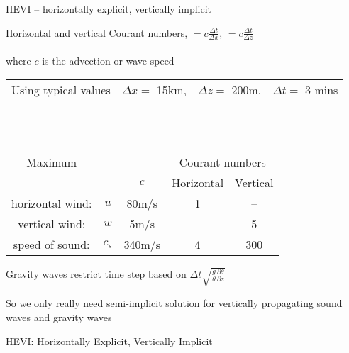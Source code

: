 \begin{slide}
HEVI -- horizontally explicit, vertically implicit

Horizontal and vertical Courant numbers, $=c\frac{\Delta t}{\Delta x}$,   $=c\frac{\Delta t}{\Delta z}$\\ \ \\
where $c$ is the advection or wave speed \\

\begin{center}

\begin{tabular}{cccc}
Using typical values & $\Delta x =$ 15km, & $\Delta z =$ 200m, & $\Delta t =$ 3 mins
\end{tabular}
\ \\ \ \\

\begin{tabular}{cc|ccc}
Maximum &&  & \multicolumn{2}{c}{Courant numbers}\\
 && $c$ & Horizontal & Vertical \\
\hline
horizontal wind: & $u$ &  80m/s & 1 & -- \\
vertical wind:   & $w$ &  5m/s  & -- & 5 \\
speed of sound:  & $c_s$ &  340m/s & 4 & 300 
\end{tabular}

\end{center}

\begin{list0}
\item Gravity waves restrict time step based on $\Delta t\sqrt{\frac{g}{\theta}\frac{\partial \theta}{\partial z}}$
\item So we only really need semi-implicit solution for vertically propagating sound waves and gravity waves
\item HEVI: Horizontally Explicit, Vertically Implicit
\end{list0}

\end{slide}

